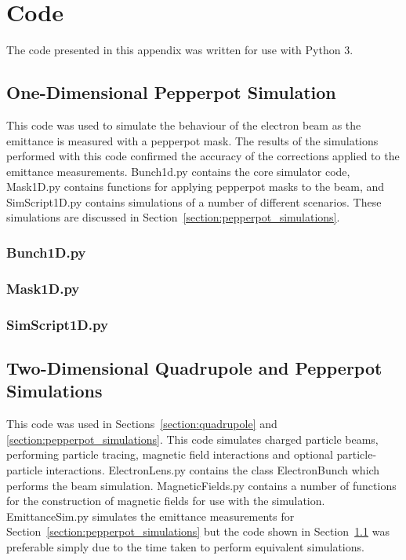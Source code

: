 \chapter{Code}\label{appendix:code}

The code presented in this appendix was written for use with Python 3.

\section{One-Dimensional Pepperpot Simulation}\label{section:1d_code}

This code was used to simulate the behaviour of the electron beam as the emittance is measured with a pepperpot mask.
The results of the simulations performed with this code confirmed the accuracy of the corrections applied to the emittance measurements.
Bunch1d.py contains the core simulator code, Mask1D.py contains functions for applying pepperpot masks to the beam, and SimScript1D.py contains simulations of a number of different scenarios.
These simulations are discussed in Section~\ref{section:pepperpot_simulations}.

\subsection{Bunch1D.py}


\subsection{Mask1D.py}


\subsection{SimScript1D.py}


\newpage
\section{Two-Dimensional Quadrupole and Pepperpot Simulations}

This code was used in Sections~\ref{section:quadrupole} and \ref{section:pepperpot_simulations}.
This code simulates charged particle beams, performing particle tracing, magnetic field interactions and optional particle-particle interactions.
ElectronLens.py contains the class ElectronBunch which performs the beam simulation.
MagneticFields.py contains a number of functions for the construction of magnetic fields for use with the simulation.
EmittanceSim.py simulates the emittance measurements for Section~\ref{section:pepperpot_simulations} but the code shown in Section~\ref{section:1d_code} was preferable simply due to the time taken to perform equivalent simulations.

